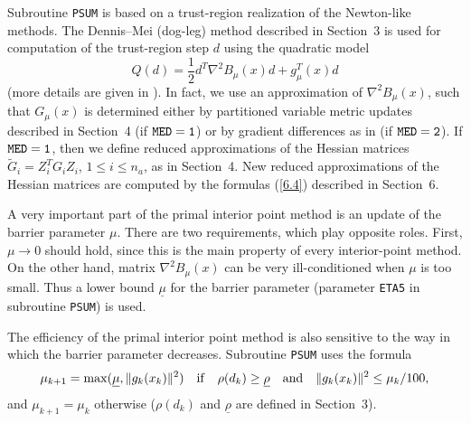 \documentclass{esub2acm}
\begin{document}
Subroutine {\tt PSUM} is based on a trust-region realization of the
Newton-like methods. The Dennis--Mei (dog-leg) method described in
Section~3 is used for computation of the trust-region step $d$ using
the quadratic model
%
%
$$Q(d) = \frac{1}{2} d^T \nabla^2 B_{\mu}(x) d + g_{\mu}^T(x)d$$
%
(more details are given in \cite{lmv3}).
In fact, we use an approximation of $\nabla^2 B_{\mu}(x)$,
such that $G_{\mu}(x)$ is determined either by partitioned variable
metric updates described in Section~4 (if ${\tt MED=1}$) or by
gradient differences as in \cite{com1} (if ${\tt MED=2}$).
If ${\tt MED=1}$, then we define reduced
approximations of the Hessian matrices $\tilde{G}_i = Z_i^T G_i Z_i$,
$1 \leq i \leq n_a$, as in Section~4. New reduced approximations of the
Hessian matrices are computed by the formulas (\ref{6.4}) described
in Section~6.

A very important part of the primal interior point method is an update
of the barrier parameter $\mu$. There are two requirements, which play
opposite roles. First, $\mu \to 0$ should hold, since this is the
main property of every interior-point method. On the other hand,
matrix $\nabla^2  B_{\mu}(x)$ can be very ill-conditioned when $\mu$
is too small.
Thus a lower bound $\underline{\mu}$ for the barrier parameter
(parameter {\tt ETA5} in subroutine {\tt PSUM}) is used.

The efficiency of the primal interior point method is also sensitive
to the way in which the barrier parameter decreases. Subroutine
{\tt PSUM} uses the formula
%
$$\mu_{k+1} = \max(\underline{\mu},\|g_k(x_k)\|^2) \quad {\rm if} \quad
\rho(d_k) \geq \underline{\rho} \quad {\rm and} \quad \|g_k(x_k)\|^2 \leq
\mu_k/100,$$
%
and $\mu_{k+1} = \mu_k$ otherwise ($\rho(d_k)$ and $\underline{\rho}$
are defined in Section~3).

\vspace{8mm}


\vspace{3mm}
\end{document}
